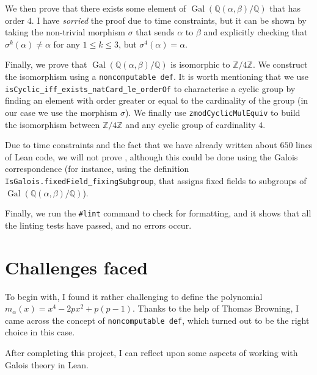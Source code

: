 \documentclass[a4paper,11pt]{article}
\theoremstyle{plain}
\newcommand{\Q}{\ensuremath{\mathbb{Q}}} %
\newcommand{\Z}{\ensuremath{\mathbb{Z}}} %
\DeclareMathOperator{\Gal}{Gal} %
\begin{document}
	
	We then prove that there exists some element of $\Gal(\Q(\alpha,\beta)/\Q)$ that has order $4$. I have \emph{sorried} the proof due to time constraints, but it can be shown by taking the non-trivial morphism $\sigma$ that sends $\alpha$ to $\beta$ and explicitly checking that $\sigma^k(\alpha)\neq \alpha$ for any $1\leq k \leq 3$, but $\sigma^4(\alpha)=\alpha$.
	
	Finally, we prove that $\Gal(\Q(\alpha,\beta)/\Q)$ is isomorphic to $\Z/4\Z$. We construct the isomorphism using a \lstinline|noncomputable def|. It is worth mentioning that we use \lstinline|isCyclic_iff_exists_natCard_le_orderOf| to characterise a cyclic group by finding an element with order greater or equal to the cardinality of the group (in our case we use the morphism $\sigma$). We finally use \lstinline|zmodCyclicMulEquiv| to build the isomorphism between $\Z/4\Z$ and any cyclic group of cardinality $4$.
	
	Due to time constraints and the fact that we have already written about $650$ lines of Lean code, we will not prove , although this could be done using the Galois correspondence (for instance, using the definition \lstinline|IsGalois.fixedField_fixingSubgroup|, that assigns fixed fields to subgroups of $\Gal(\Q(\alpha,\beta)/\Q)$). 
	
	Finally, we run the \lstinline|#lint| command to check for formatting, and it shows that all the linting tests have passed, and no errors occur.
	
	\section{Challenges faced}\label{sec:challenges}
	
	To begin with, I found it rather challenging to define the polynomial $m_\alpha(x)=x^4-2px^2+p(p-1)$. Thanks to the help of Thomas Browning, I came across the concept of \lstinline|noncomputable def|, which turned out to be the right choice in this case.
	
	After completing this project, I can reflect upon some aspects of working with Galois theory in Lean.
	
\end{document}
